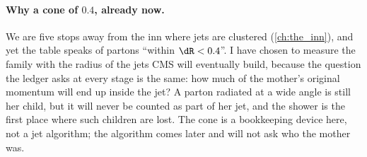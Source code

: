 \paragraph{Why a cone of $0.4$, already now.} We are five stops away from
the inn where jets are clustered (\cref{ch:the_inn}), and yet the table
speaks of partons ``within $\dR<0.4$''. I have chosen to measure the family
with the radius of the jets CMS will eventually build, because the question
the ledger asks at every stage is the same: how much of the mother's original
momentum will end up inside the jet? A parton radiated at a wide angle is
still her child, but it will never be counted as part of her jet, and the
shower is the first place where such children are lost. The cone is a
bookkeeping device here, not a jet algorithm; the algorithm comes later and
will not ask who the mother was.

